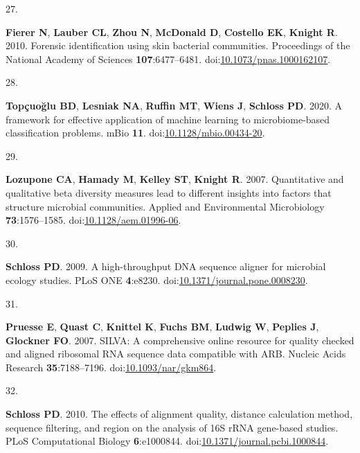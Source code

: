 \documentclass[
  11pt,
]{article}
\newlength{\cslhangindent}
\newlength{\csllabelwidth}
\newenvironment{CSLReferences}[2] %
 {\begin{list}{}{%
  \setlength{\itemindent}{0pt}
  \setlength{\leftmargin}{0pt}
  \setlength{\parsep}{0pt}
  \ifodd #1
   \setlength{\leftmargin}{\cslhangindent}
   \setlength{\itemindent}{-1\cslhangindent}
  \fi
  \setlength{\itemsep}{#2\baselineskip}}}
 {\end{list}}
\newcommand{\CSLLeftMargin}[1]{\parbox[t]{\csllabelwidth}{\strut#1\strut}}
\newcommand{\CSLRightInline}[1]{\parbox[t]{\linewidth - \csllabelwidth}{\strut#1\strut}}
\begin{document}
\begin{CSLReferences}{0}{1}
\CSLLeftMargin{27. }%
\CSLRightInline{\textbf{Fierer N}, \textbf{Lauber CL}, \textbf{Zhou N},
\textbf{McDonald D}, \textbf{Costello EK}, \textbf{Knight R}. 2010.
Forensic identification using skin bacterial communities. Proceedings of
the National Academy of Sciences \textbf{107}:6477--6481.
doi:\href{https://doi.org/10.1073/pnas.1000162107}{10.1073/pnas.1000162107}.}

\CSLLeftMargin{28. }%
\CSLRightInline{\textbf{Topçuoğlu BD}, \textbf{Lesniak NA},
\textbf{Ruffin MT}, \textbf{Wiens J}, \textbf{Schloss PD}. 2020. A
framework for effective application of machine learning to
microbiome-based classification problems. mBio \textbf{11}.
doi:\href{https://doi.org/10.1128/mbio.00434-20}{10.1128/mbio.00434-20}.}

\CSLLeftMargin{29. }%
\CSLRightInline{\textbf{Lozupone CA}, \textbf{Hamady M}, \textbf{Kelley
ST}, \textbf{Knight R}. 2007. Quantitative and qualitative beta
diversity measures lead to different insights into factors that
structure microbial communities. Applied and Environmental Microbiology
\textbf{73}:1576--1585.
doi:\href{https://doi.org/10.1128/aem.01996-06}{10.1128/aem.01996-06}.}

\CSLLeftMargin{30. }%
\CSLRightInline{\textbf{Schloss PD}. 2009. A high-throughput DNA
sequence aligner for microbial ecology studies. PLoS ONE
\textbf{4}:e8230.
doi:\href{https://doi.org/10.1371/journal.pone.0008230}{10.1371/journal.pone.0008230}.}

\CSLLeftMargin{31. }%
\CSLRightInline{\textbf{Pruesse E}, \textbf{Quast C}, \textbf{Knittel
K}, \textbf{Fuchs BM}, \textbf{Ludwig W}, \textbf{Peplies J},
\textbf{Glockner FO}. 2007. SILVA: A comprehensive online resource for
quality checked and aligned ribosomal RNA sequence data compatible with
ARB. Nucleic Acids Research \textbf{35}:7188--7196.
doi:\href{https://doi.org/10.1093/nar/gkm864}{10.1093/nar/gkm864}.}

\CSLLeftMargin{32. }%
\CSLRightInline{\textbf{Schloss PD}. 2010. The effects of alignment
quality, distance calculation method, sequence filtering, and region on
the analysis of 16S rRNA gene-based studies. PLoS Computational Biology
\textbf{6}:e1000844.
doi:\href{https://doi.org/10.1371/journal.pcbi.1000844}{10.1371/journal.pcbi.1000844}.}


\end{CSLReferences}
\end{document}
